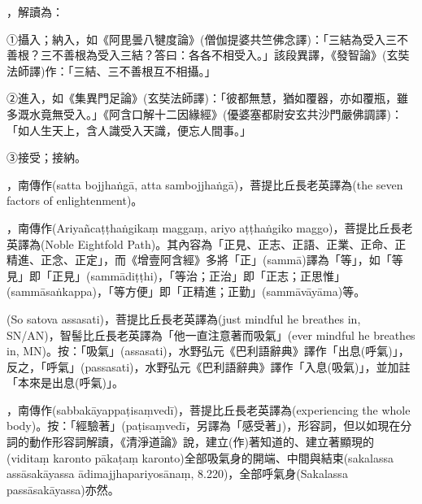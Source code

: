 \startitemgroup[noteitems]
\item{}，解讀為：
\item{}①攝入；納入，如《阿毘曇八犍度論》(僧伽提婆共竺佛念譯)：「三結為受入三不善根？三不善根為受入三結？答曰：各各不相受入。」該段異譯，《發智論》(玄奘法師譯)作：「三結、三不善根互不相攝。」
\item{}②進入，如《集異門足論》(玄奘法師譯)：「彼都無慧，猶如覆器，亦如覆瓶，雖多溉水竟無受入。」《阿含口解十二因緣經》(優婆塞都尉安玄共沙門嚴佛調譯)：「如人生天上，含人識受入天識，便忘人間事。」
\item{}③接受；接納。
\stopitemgroup

\startitemgroup[noteitems]
\item{}，南傳作(satta bojjhaṅgā, atta sambojjhaṅgā)，菩提比丘長老英譯為(the seven factors of enlightenment)。
\stopitemgroup

\startitemgroup[noteitems]
\item{}，南傳作(Ariyañcaṭṭhaṅgikaṃ maggaṃ, ariyo aṭṭhaṅgiko maggo)，菩提比丘長老英譯為(Noble Eightfold Path)。其內容為「正見、正志、正語、正業、正命、正精進、正念、正定」，而《增壹阿含經》多將「正」(sammā)譯為「等」，如「等見」即「正見」(sammādiṭṭhi)，「等治；正治」即「正志；正思惟」(sammāsaṅkappa)，「等方便」即「正精進；正勤」(sammāvāyāma)等。
\stopitemgroup

\startitemgroup[noteitems]
\item{}(So satova assasati)，菩提比丘長老英譯為(just mindful he breathes in, SN/AN)，智髻比丘長老英譯為「他一直注意著而吸氣」(ever mindful he breathes in, MN)。按：「吸氣」(assasati)，水野弘元《巴利語辭典》譯作「出息(呼氣)」，反之，「呼氣」(passasati)，水野弘元《巴利語辭典》譯作「入息(吸氣)」，並加註「本來是出息(呼氣)」。
\stopitemgroup

\startitemgroup[noteitems]
\item{}，南傳作(sabbakāyappaṭisaṃvedī)，菩提比丘長老英譯為(experiencing the whole body)。按：「經驗著」(paṭisaṃvedī，另譯為「感受著」)，形容詞，但以如現在分詞的動作形容詞解讀，《清淨道論》說，建立(作)著知道的、建立著顯現的(viditaṃ karonto pākaṭaṃ karonto)全部吸氣身的開端、中間與結束(sakalassa assāsakāyassa ādimajjhapariyosānaṃ, 8.220)，全部呼氣身(Sakalassa passāsakāyassa)亦然。
\stopitemgroup


